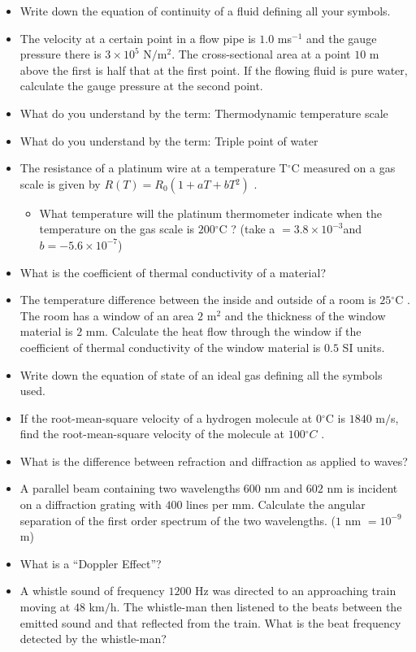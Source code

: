 \documentclass{article}
\begin{document}
\begin{itemize}
\item Write down the equation of continuity of a fluid defining all your symbols.
\item The velocity at a certain point in a flow pipe is $ 1.0$ ms$ ^{-1}$ and the gauge pressure there is $ 3 \times 10^5 $ N$/$m$ ^{2}$ ​ . The cross-sectional area at a point $ 10$ m above the first is half that at the first point. If the flowing fluid is pure water, calculate the gauge pressure at the second point.
\item What do you understand by the term: Thermodynamic temperature scale
\item What do you understand by the term:   Triple point of water
\item The resistance of a platinum wire at a temperature T​$ ^{\circ}$C measured on a gas scale is given by $ R(T)=R​_{0​}(1+ a T+bT​^{2}​)$ .
 \begin{itemize}
\item What temperature will the platinum thermometer indicate when the temperature on the gas scale is $ 200​^{\circ}$C ? (take a $ =3.8 \times 10^{-3}$ ​ and $ b=-5.6 \times 10^{-7}$ ​)
\end{itemize}
\item What is the coefficient of thermal conductivity of a material?
\item The temperature difference between the inside and outside of a room is $ 25​^{\circ}$C . The room has a window of an area $ 2$ m$ ​^{2}$ and the thickness of the window material is $ 2$ mm. Calculate the heat flow through the window if the coefficient of thermal conductivity of the window material is $ 0.5$ SI units.
\item Write down the equation of state of an ideal gas defining all the symbols used.
\item If the root-mean-square velocity of a hydrogen molecule at $ 0​ ^{\circ}$C is $ 1840$ m$/$s, find the root-mean-square velocity of the molecule at $ 100​ ^{\circ}$ ​ $ C$ .
\item What is the difference between refraction and diffraction as applied to waves?
\item A parallel beam containing two wavelengths $ 600$ nm and $ 602$ nm is incident on a diffraction grating with $ 400$ lines per mm. Calculate the angular separation of the first order spectrum of the two wavelengths. ($ 1$ nm $ =10^{-9}$ m)
\item What is a “Doppler Effect”?
\item A whistle sound of frequency $ 1200$ Hz was directed to an approaching train moving at $ 48$ km$/$h​ . The whistle-man then listened to the beats between the emitted sound and that reflected from the train. What is the beat frequency detected by the whistle-man?

\end{itemize}
\end{document}
